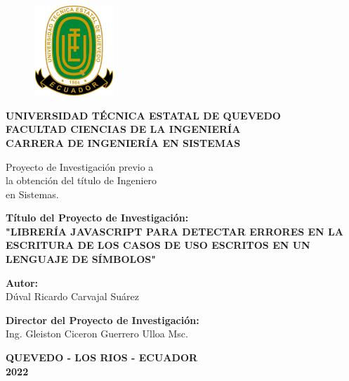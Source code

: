 \begin{center}
		\begin{figure}[htb]
		\begin{center}
			\includegraphics[width=3.04cm,height=3.39cm]{img/logoUTEQ.png}
		\end{center}
	\end{figure}
	{\caratuladc \textbf{UNIVERSIDAD TÉCNICA ESTATAL DE QUEVEDO}}\\
	\vspace*{0.2cm}
	{\titulosndc \textbf{FACULTAD CIENCIAS DE LA INGENIERÍA}}\\
	\vspace*{0.2cm}
	{\titulosndc \textbf{CARRERA DE INGENIERÍA EN SISTEMAS}}\\
	\vspace*{0.2in}
	
	\begin{flushright}
		Proyecto de Investigación previo a \\
		 la obtención del título de Ingeniero \\ en Sistemas. 
	\end{flushright}
	\vspace*{0.2in}
		
	\textbf{Título del Proyecto de Investigación:} \\
	\vspace*{0.3cm}
	\textbf{"LIBRERÍA JAVASCRIPT PARA DETECTAR ERRORES EN LA ESCRITURA DE LOS CASOS DE USO ESCRITOS EN UN LENGUAJE DE SÍMBOLOS"}
	\vspace*{0.3in}
	
	\textbf{Autor:} \\
	\vspace*{0.3cm}
	Dúval Ricardo Carvajal Suárez
	\vspace*{0.3in}
	
	\textbf{Director del Proyecto de Investigación:} \\
	\vspace*{0.3cm}
	Ing. Gleiston Ciceron Guerrero Ulloa Msc.
	\vspace*{0.3in}
	
	\textbf{QUEVEDO - LOS RIOS - ECUADOR} \\
	\textbf{2022}
	
\end{center}